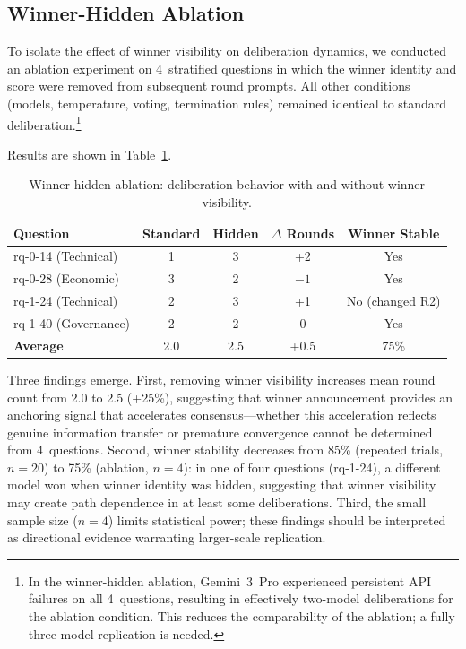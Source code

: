 \documentclass[11pt,a4paper]{article}
\begin{document}
\subsection{Winner-Hidden Ablation}
\label{sec:ablation}

To isolate the effect of winner visibility on deliberation dynamics, we conducted an ablation experiment on 4~stratified questions in which the winner identity and score were removed from subsequent round prompts. All other conditions (models, temperature, voting, termination rules) remained identical to standard deliberation.\footnote{In the winner-hidden ablation, Gemini~3~Pro experienced persistent API failures on all 4~questions, resulting in effectively two-model deliberations for the ablation condition. This reduces the comparability of the ablation; a fully three-model replication is needed.}

Results are shown in Table~\ref{tab:ablation}.

\begin{table}[ht]
\centering
\caption{Winner-hidden ablation: deliberation behavior with and without winner visibility.}
\label{tab:ablation}
\begin{tabular}{lcccc}
\toprule
\textbf{Question} & \textbf{Standard} & \textbf{Hidden} & \textbf{$\Delta$ Rounds} & \textbf{Winner Stable} \\
\midrule
rq-0-14 (Technical) & 1 & 3 & +2 & Yes \\
rq-0-28 (Economic) & 3 & 2 & $-1$ & Yes \\
rq-1-24 (Technical) & 2 & 3 & +1 & No (changed R2) \\
rq-1-40 (Governance) & 2 & 2 & 0 & Yes \\
\midrule
\textbf{Average} & 2.0 & 2.5 & +0.5 & 75\% \\
\bottomrule
\end{tabular}
\end{table}

Three findings emerge. First, removing winner visibility increases mean round count from 2.0 to 2.5 (+25\%), suggesting that winner announcement provides an anchoring signal that accelerates consensus---whether this acceleration reflects genuine information transfer or premature convergence cannot be determined from 4~questions. Second, winner stability decreases from 85\% (repeated trials, $n=20$) to 75\% (ablation, $n=4$): in one of four questions (rq-1-24), a different model won when winner identity was hidden, suggesting that winner visibility may create path dependence in at least some deliberations. Third, the small sample size ($n=4$) limits statistical power; these findings should be interpreted as directional evidence warranting larger-scale replication.
\end{document}
